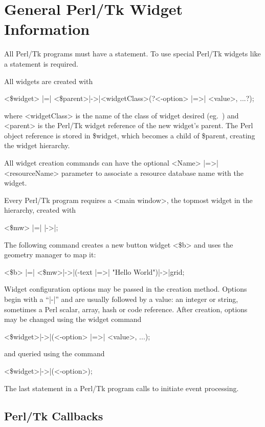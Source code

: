 \section{General Perl/Tk Widget Information} 

All Perl/Tk programs must have a  statement.  To use special Perl/Tk
widgets like  a  statement is required.

All widgets are created with

\quad \quad <\$widget> |=| <\$parent>|->|<widgetClass>(?<-option> |=>| <value>, ...?);

where <widgetClass> is the name of the class of 
widget desired (eg.\ ) and <parent> is the Perl/Tk widget reference
of the new widget's parent.  The Perl object reference is stored in \$widget,
which becomes a child of \$parent, creating the widget hierarchy.

All widget creation commands can have the optional <Name> |=>| <resourceName> 
parameter to associate a resource database name with the widget.  

Every Perl/Tk program requires a <main window>, the topmost widget in the
hierarchy, created with

\quad \quad <\$mw> |=| |->|;

The following command creates a new button widget <\$b> and uses the 
geometry manager to map it:

\quad \quad <\$b> |=| <\$mw>|->|(-text |=>| "Hello World")|->|grid;

Widget configuration options may be passed in the creation method.  Options
begin with a ``|-|'' and are usually followed by a value: 
 an integer
or string, sometimes a Perl scalar, array, hash or code reference.  After
creation, options may be changed using the  widget command

\quad \quad <\$widget>|->|(<-option> |=>| <value>, ...);

and queried using the  command

\quad \quad <\$widget>|->|(<-option>);

The last statement in a Perl/Tk program calls  to initiate
event processing.

\subsection*{Perl/Tk Callbacks}

